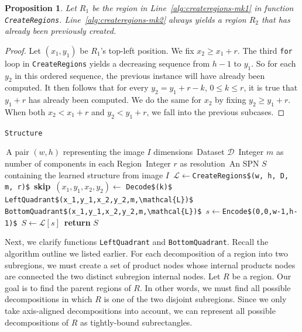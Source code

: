 \documentclass{amsart}
\theoremstyle{plain}
\newcounter{dummy-def}\numberwithin{dummy-def}{section}
\newcounter{dummy-thm}\numberwithin{dummy-thm}{section}
\newcounter{dummy-prop}\numberwithin{dummy-prop}{section}
\newtheorem{proposition}[dummy-prop]{Proposition}
\newcounter{dummy-corollary}\numberwithin{dummy-corollary}{section}
\newcounter{dummy-lemma}\numberwithin{dummy-lemma}{section}
\newcounter{dummy-ex}\numberwithin{dummy-ex}{section}
\newcounter{dummy-eg}\numberwithin{dummy-eg}{section}
\numberwithin{equation}{section}
\newcommand{\code}[1]{\lstinline[mathescape=true]{#1}}
\newcommand{\mcode}[1]{\lstinline[mathescape]!#1!}
\begin{document}
\begin{proposition} Let $R_1$ be the region in Line~\ref{alg:createregions-mk1} in function
  \code{CreateRegions}.  Line~\ref{alg:createregions-mk2} always yields a region $R_2$ that has
  already been previously created.
\end{proposition}
\begin{proof}
  Let $(x_1,y_1)$ be $R_1$'s top-left position. We fix $x_2\geq x_1+r$. The third \code{for} loop
  in \code{CreateRegions} yields a decreasing sequence from $h-1$ to $y_1$. So for each $y_2$ in
  this ordered sequence, the previous instance will have already been computed. It then follows
  that for every $y_2=y_1+r-k$, $0\leq k\leq r$, it is true that $y_1+r$ has already been computed.
  We do the same for $x_2$ by fixing $y_2\geq y_1+r$. When both $x_2<x_1+r$ and $y_2<y_1+r$, we
  fall into the previous subcases.
\end{proof}

\begin{algorithm}[h]
  \caption{\code{Structure}}\label{alg:structure}
  \begin{algorithmic}[1]
    \Require\,A pair $(w,h)$ representing the image $I$ dimensions
    \Require\,Dataset $\mathcal{D}$
    \Require\,Integer $m$ as number of components in each Region
    \Require\,Integer $r$ as resolution
    \Ensure\,An SPN $S$ containing the learned structure from image $I$
    \State\,$\mathcal{L}\gets$\mcode{CreateRegions$(w, h, D, m, r)$}
        \State\,\textbf{skip}
      \EndIf%
      \State\,$(x_1,y_1,x_2,y_2)\gets$ \mcode{Decode$(k)$}
      \State\,\mcode{LeftQuadrant$(x_1,y_1,x_2,y_2,m,\mathcal{L})$}
      \State\,\mcode{BottomQuadrant$(x_1,y_1,x_2,y_2,m,\mathcal{L})$}
    \EndFor%
    \State\,$s\gets$\mcode{Encode$(0,0,w-1,h-1)$}
    \State\,$S\gets\mathcal{L}[s]$
    \State\,\textbf{return} $S$
  \end{algorithmic}
\end{algorithm}

Next, we clarify functions \mcode{LeftQuadrant} and \mcode{BottomQuadrant}. Recall the algorithm
outline we listed earlier. For each decomposition of a region into two subregions, we must create a
set of product nodes whose internal products nodes are connected the two distinct subregion
internal nodes. Let $R$ be a region. Our goal is to find the parent regions of $R$. In other words,
we must find all possible decompositions in which $R$ is one of the two disjoint subregions. Since
we only take axis-aligned decompositions into account, we can represent all possible decompositions
of $R$ as tightly-bound subrectangles.
\end{document}
